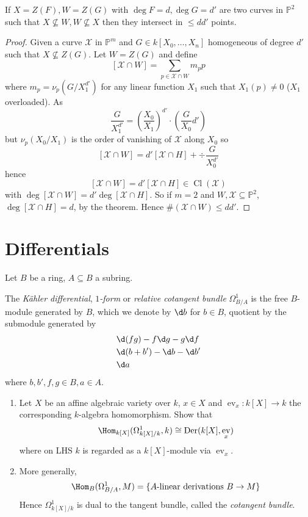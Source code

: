 \documentclass[a4paper]{article}
\DeclareMathOperator{\ev}{ev}
\DeclareMathOperator{\Cl}{Cl}
\renewcommand*{\P}{\mathbb{P}}
\DeclareMathOperator{\Der}{Der} %
\begin{document}
\begin{corollary}
  If \(X = Z(F), W = Z(G)\) with \(\deg F = d, \deg G = d'\) are two curves in \(\P^2\) such that \(X \nsubseteq W, W \nsubseteq X\) then they intersect in \(\leq dd'\) points.
\end{corollary}

\begin{proof}
  Given a curve \(\mathcal X\) in \(\P^m\) and \(G \in k[X_0, \dots, X_n]\) homogeneous of degree \(d'\) such that \(X \nsubseteq Z(G)\). Let \(W = Z(G)\) and define
  \[
    [\mathcal X \cap W] = \sum_{p \in \mathcal X \cap W} m_p p
  \]
  where \(m_p = \nu_p(G/X_1^{d'})\) for any linear function \(X_1\) such that \(X_1(p) \neq 0\) (\(X_1\) overloaded). As
  \[
    \frac{G}{X_1^{d'}} = \left( \frac{X_0}{X_1} \right)^{d'} \cdot \left( \frac{G}{X_0} d' \right)
  \]
  but \(\nu_p(X_0/X_1)\) is the order of vanishing of \(\mathcal X\) along \(X_0\) so
  \[
    [\mathcal X \cap W] = d'[\mathcal X \cap H] + \div \frac{G}{X_0^{d'}}
  \]
  hence
  \[
    [\mathcal X \cap W] = d' [\mathcal X \cap H] \in \Cl(\mathcal X)
  \]
  with \(\deg [\mathcal X \cap W] = d' \deg [\mathcal X \cap H]\). So if \(m = 2\) and \(W, \mathcal X \subseteq \P^2\), \(\deg[\mathcal X \cap H] = d\), by the theorem. Hence \(\# (\mathcal X \cap W) \leq dd'\).
\end{proof}

\section{Differentials}

Let \(B\) be a ring, \(A \subseteq B\) a subring.

\begin{definition}
  The \emph{Kähler differential}, \emph{\(1\)-form} or \emph{relative cotangent bundle} \(\Omega^1_{B/A}\) is the free \(B\)-module generated by \(B\), which we denote by \(\d b\) for \(b \in B\), quotient by the submodule generated by
  \begin{align*}
    &\d(fg) - f \d g - g \d f \\
    &\d(b + b') - \d b - \d b' \\
    &\d a
  \end{align*}
  where \(b, b', f, g \in B, a \in A\).
\end{definition}

\begin{ex}\leavevmode
  \begin{enumerate}
  \item Let \(X\) be an affine algebraic variety over \(k\), \(x \in X\) and \(\ev_x: k[X] \to k\) the corresponding \(k\)-algebra homomorphism. Show that
    \[
      \Hom_{k[X]} (\Omega^1_{k[X]/k}, k) \cong \Der(k[X], \ev_x)
    \]
    where on LHS \(k\) is regarded as a \(k[X]\)-module via \(\ev_x\).
  \item More generally,
    \[
      \Hom_B(\Omega^1_{B/A}, M) = \{A\text{-linear derivations } B \to M\}
    \]
    Hence \(\Omega^1_{k[X]/k}\) is dual to the tangent bundle, called the \emph{cotangent bundle}.
  \end{enumerate}
\end{ex}
\end{document}
